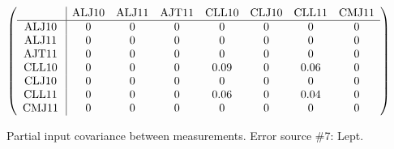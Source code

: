 \begin{table}[H]
\scriptsize
\begin{center}
\renewcommand{\arraystretch}{1.1}
\begin{math}\left(\begin{array}{c|ccccccc}
 & \mathrm{ALJ10} & 
\mathrm{ALJ11} & 
\mathrm{AJT11} & 
\mathrm{CLL10} & 
\mathrm{CLJ10} & 
\mathrm{CLL11} & 
\mathrm{CMJ11} \\
\hline
\mathrm{ALJ10} \hspace*{2pt} &  0 &  0 &  0 &  0 &  0 &  0 &  0 \\
\mathrm{ALJ11} \hspace*{2pt} &  0 &  0 &  0 &  0 &  0 &  0 &  0 \\
\mathrm{AJT11} \hspace*{2pt} &  0 &  0 &  0 &  0 &  0 &  0 &  0 \\
\mathrm{CLL10} \hspace*{2pt} &  0 &  0 &  0 &       0.09 &  0 &       0.06 &  0 \\
\mathrm{CLJ10} \hspace*{2pt} &  0 &  0 &  0 &  0 &  0 &  0 &  0 \\
\mathrm{CLL11} \hspace*{2pt} &  0 &  0 &  0 &       0.06 &  0 &       0.04 &  0 \\
\mathrm{CMJ11} \hspace*{2pt} &  0 &  0 &  0 &  0 &  0 &  0 &  0 \\
\end{array}\right)\end{math}
\caption{Partial input covariance between measurements. Error source \#7: Lept.}
\renewcommand{\arraystretch}{1}
\end{center}
\end{table}
